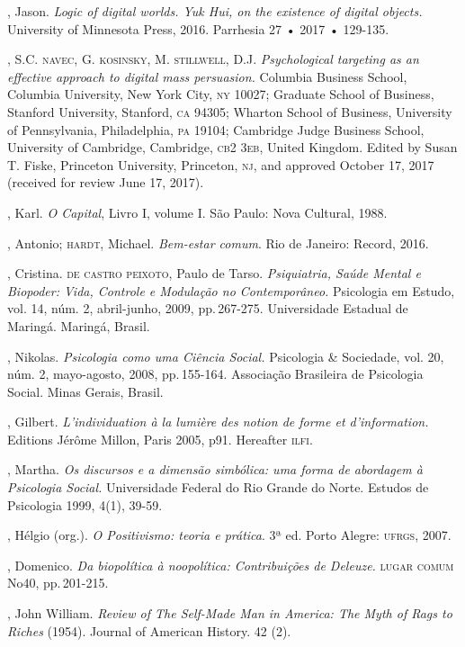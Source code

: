 \begin{bibliohedra}
, Jason. \emph{Logic of digital worlds. Yuk Hui, on the
existence of digital objects.} University of Minnesota Press, 2016.
Parrhesia 27 • 2017 • 129-135.

, S.C. \textsc{navec}, G. \textsc{kosinsky}, M. \textsc{stillwell}, D.J. \emph{Psychological targeting as an effective approach to digital mass persuasion.} Columbia
Business School, Columbia University, New York City, \textsc{ny} 10027; Graduate
School of Business, Stanford University, Stanford, \textsc{ca} 94305; Wharton
School of Business, University of Pennsylvania, Philadelphia, \textsc{pa} 19104;
Cambridge Judge Business School, University of Cambridge, Cambridge, \textsc{cb}2
3\textsc{eb}, United Kingdom. Edited by Susan T. Fiske, Princeton University,
Princeton, \textsc{nj}, and approved October 17, 2017 (received for review June
17, 2017).

, Karl. \emph{O Capital}, Livro I, volume I. São Paulo: Nova
Cultural, 1988.

, Antonio; \textsc{hardt}, Michael. \emph{Bem-estar comum}. Rio de
Janeiro: Record, 2016.

, Cristina. \textsc{de castro peixoto}, Paulo de Tarso.
\emph{Psiquiatria, Saúde Mental e Biopoder: Vida, Controle e Modulação
no Contemporâneo.} Psicologia em Estudo, vol. 14, núm. 2, abril-junho,
2009, pp.\,267-275. Universidade Estadual de Maringá. Maringá, Brasil.

, Nikolas. \emph{Psicologia como uma Ciência Social.} Psicologia
\& Sociedade, vol. 20, núm. 2, mayo-agosto, 2008, pp.\,155-164.
Associação Brasileira de Psicologia Social. Minas Gerais, Brasil.

, Gilbert. \emph{L'individuation à la lumière des notion de
forme et d'information.} Editions Jérôme Millon, Paris 2005, p91.
Hereafter \textsc{ilfi}.

, Martha. \emph{Os discursos e a dimensão simbólica: uma
forma de abordagem à Psicologia Social.} Universidade Federal do Rio
Grande do Norte. Estudos de Psicologia 1999, 4(1), 39-59.

, Hélgio (org.). \emph{O Positivismo: teoria e prática}. 3ª
ed. Porto Alegre: \textsc{ufrgs}, 2007.

, Domenico. \emph{Da biopolítica à noopolítica: Contribuições de Deleuze.} \textsc{lugar comum} No40, pp.\,201-215.

, John William. \emph{Review of The Self-Made Man in America:
The Myth of Rags to Riches} (1954). Journal of American History. 42 (2).
\end{bibliohedra}


